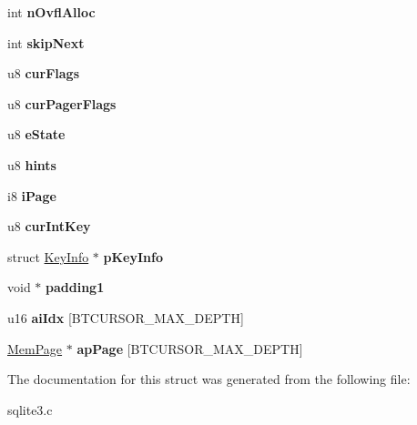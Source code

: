 \begin{DoxyCompactItemize}
\item 
int {\bfseries n\+Ovfl\+Alloc}\hypertarget{structBtCursor_a114e01e9e27ae7640796fa6258bda937}{}\label{structBtCursor_a114e01e9e27ae7640796fa6258bda937}

\item 
int {\bfseries skip\+Next}\hypertarget{structBtCursor_ab1dfdbd6c9ec6cdb21cdb5deaa6d5ecb}{}\label{structBtCursor_ab1dfdbd6c9ec6cdb21cdb5deaa6d5ecb}

\item 
u8 {\bfseries cur\+Flags}\hypertarget{structBtCursor_ab120d81b3550eabce37f377cbdae8836}{}\label{structBtCursor_ab120d81b3550eabce37f377cbdae8836}

\item 
u8 {\bfseries cur\+Pager\+Flags}\hypertarget{structBtCursor_aff2ef1cec10fbfc0c2d35277b5ee4432}{}\label{structBtCursor_aff2ef1cec10fbfc0c2d35277b5ee4432}

\item 
u8 {\bfseries e\+State}\hypertarget{structBtCursor_a30ab5e7109965b34a08562a7b7e6de15}{}\label{structBtCursor_a30ab5e7109965b34a08562a7b7e6de15}

\item 
u8 {\bfseries hints}\hypertarget{structBtCursor_ad8c66c31cf1a2c2181d61a64ca951a8a}{}\label{structBtCursor_ad8c66c31cf1a2c2181d61a64ca951a8a}

\item 
i8 {\bfseries i\+Page}\hypertarget{structBtCursor_adfe516b0ae2c030f5963fda944bf6d8e}{}\label{structBtCursor_adfe516b0ae2c030f5963fda944bf6d8e}

\item 
u8 {\bfseries cur\+Int\+Key}\hypertarget{structBtCursor_a37db7ea50e0f355ea6a3d8d3213722c3}{}\label{structBtCursor_a37db7ea50e0f355ea6a3d8d3213722c3}

\item 
struct \hyperlink{structKeyInfo}{Key\+Info} $\ast$ {\bfseries p\+Key\+Info}\hypertarget{structBtCursor_ad2360bda13f959ed70672eb421fdb5ec}{}\label{structBtCursor_ad2360bda13f959ed70672eb421fdb5ec}

\item 
void $\ast$ {\bfseries padding1}\hypertarget{structBtCursor_ac4321376ea6d26d2aa7f7cc905e09310}{}\label{structBtCursor_ac4321376ea6d26d2aa7f7cc905e09310}

\item 
u16 {\bfseries ai\+Idx} \mbox{[}B\+T\+C\+U\+R\+S\+O\+R\+\_\+\+M\+A\+X\+\_\+\+D\+E\+P\+TH\mbox{]}\hypertarget{structBtCursor_a037a739198de5bee22ca203d34e90af1}{}\label{structBtCursor_a037a739198de5bee22ca203d34e90af1}

\item 
\hyperlink{structMemPage}{Mem\+Page} $\ast$ {\bfseries ap\+Page} \mbox{[}B\+T\+C\+U\+R\+S\+O\+R\+\_\+\+M\+A\+X\+\_\+\+D\+E\+P\+TH\mbox{]}\hypertarget{structBtCursor_ad3414d944f9578e86e26c6158f92096b}{}\label{structBtCursor_ad3414d944f9578e86e26c6158f92096b}

\end{DoxyCompactItemize}


The documentation for this struct was generated from the following file\+:\begin{DoxyCompactItemize}
\item 
sqlite3.\+c\end{DoxyCompactItemize}
